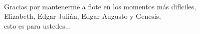 
\begin{dedicatoria} 
\\[14\baselineskip]
Gracias por mantenerme a flote en los momentos más difíciles,\\Elizabeth, Edgar Julián, Edgar Augusto y Genesis,\\esto es para ustedes...

\end{dedicatoria}
